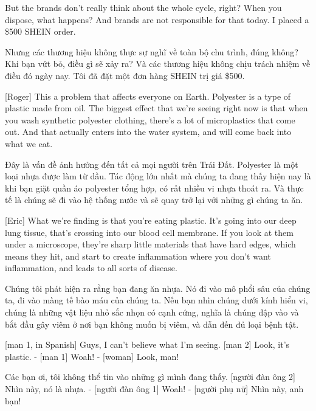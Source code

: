 \documentclass[a4paper]{article}
\begin{document}
	But the brands don't really think about the whole cycle, right?
	When you dispose, what happens?
	And brands are not responsible for that today.
	I placed a \$500 SHEIN order.
	
	\begin{vietnamese-v2}
		Nhưng các thương hiệu không thực sự nghĩ về toàn bộ chu trình, đúng không?
		Khi bạn vứt bỏ, điều gì sẽ xảy ra?
		Và các thương hiệu không chịu trách nhiệm về điều đó ngày nay.
		Tôi đã đặt một đơn hàng SHEIN trị giá \$500.
	\end{vietnamese-v2}
	
	
	[Roger] This a problem that affects everyone on Earth.
	Polyester is a type of plastic made from oil.
	The biggest effect that we're seeing right now
	is that when you wash synthetic polyester clothing, there's a lot of microplastics that come out.
	And that actually enters into the water system, and will come back into what we eat.
	
	\begin{vietnamese-v2}
		[Roger] Đây là vấn đề ảnh hưởng đến tất cả mọi người trên Trái Đất.
		Polyester là một loại nhựa được làm từ dầu.
		Tác động lớn nhất mà chúng ta đang thấy hiện nay
		là khi bạn giặt quần áo polyester tổng hợp, có rất nhiều vi nhựa thoát ra.
		Và thực tế là chúng sẽ đi vào hệ thống nước và sẽ quay trở lại với những gì chúng ta ăn.
	\end{vietnamese-v2}
	
	
	[Eric] What we're finding is that you're eating plastic.
	It's going into our deep lung tissue, that's crossing into our blood cell membrane.
	If you look at them under a microscope, they're sharp little materials that have hard edges, which means they hit, and start to create inflammation where you don't want inflammation, and leads to all sorts of disease.
	
	\begin{vietnamese-v2}
		[Eric] Chúng tôi phát hiện ra rằng bạn đang ăn nhựa.
		Nó đi vào mô phổi sâu của chúng ta, đi vào màng tế bào máu của chúng ta.
		Nếu bạn nhìn chúng dưới kính hiển vi, chúng là những vật liệu nhỏ sắc nhọn có cạnh cứng, nghĩa là chúng đập vào và bắt đầu gây viêm ở nơi bạn không muốn bị viêm, và dẫn đến đủ loại bệnh tật.
	\end{vietnamese-v2}
	
	[man 1, in Spanish] Guys, I can't believe what I'm seeing.
	[man 2] Look, it's plastic.
	- [man 1] Woah! - [woman] Look, man!
	
	\begin{vietnamese-v2}
		 Các bạn ơi, tôi không thể tin vào những gì mình đang thấy.
		[người đàn ông 2] Nhìn này, nó là nhựa.
		- [người đàn ông 1] Woah! - [người phụ nữ] Nhìn này, anh bạn!
	\end{vietnamese-v2}
	
\end{document}
